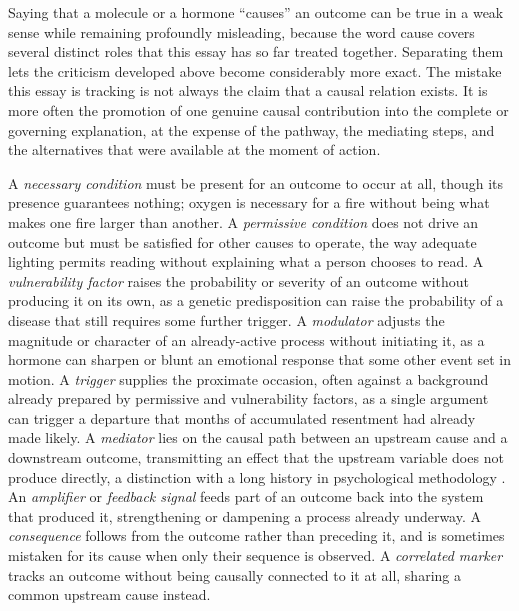\documentclass[11pt]{article}
\begin{document}
Saying that a molecule or a hormone ``causes'' an outcome can be true in a weak sense while remaining profoundly misleading, because the word cause covers several distinct roles that this essay has so far treated together. Separating them lets the criticism developed above become considerably more exact. The mistake this essay is tracking is not always the claim that a causal relation exists. It is more often the promotion of one genuine causal contribution into the complete or governing explanation, at the expense of the pathway, the mediating steps, and the alternatives that were available at the moment of action.

A \emph{necessary condition} must be present for an outcome to occur at all, though its presence guarantees nothing; oxygen is necessary for a fire without being what makes one fire larger than another. A \emph{permissive condition} does not drive an outcome but must be satisfied for other causes to operate, the way adequate lighting permits reading without explaining what a person chooses to read. A \emph{vulnerability factor} raises the probability or severity of an outcome without producing it on its own, as a genetic predisposition can raise the probability of a disease that still requires some further trigger. A \emph{modulator} adjusts the magnitude or character of an already-active process without initiating it, as a hormone can sharpen or blunt an emotional response that some other event set in motion. A \emph{trigger} supplies the proximate occasion, often against a background already prepared by permissive and vulnerability factors, as a single argument can trigger a departure that months of accumulated resentment had already made likely. A \emph{mediator} lies on the causal path between an upstream cause and a downstream outcome, transmitting an effect that the upstream variable does not produce directly, a distinction with a long history in psychological methodology \citep{baronkenny1986moderator}. An \emph{amplifier} or \emph{feedback signal} feeds part of an outcome back into the system that produced it, strengthening or dampening a process already underway. A \emph{consequence} follows from the outcome rather than preceding it, and is sometimes mistaken for its cause when only their sequence is observed. A \emph{correlated marker} tracks an outcome without being causally connected to it at all, sharing a common upstream cause instead.
\end{document}
